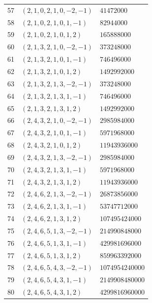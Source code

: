 \begin{longtable}{@{}rll@{}}
57 & $(2,1,0,2,1,0,-2,-1)$ & $41472000$\\
58 & $(2,1,0,2,1,0,1,-1)$ & $82944000$\\
59 & $(2,1,0,2,1,0,1,2)$ & $165888000$\\
60 & $(2,1,3,2,1,0,-2,-1)$ & $373248000$\\
61 & $(2,1,3,2,1,0,1,-1)$ & $746496000$\\
62 & $(2,1,3,2,1,0,1,2)$ & $1492992000$\\
63 & $(2,1,3,2,1,3,-2,-1)$ & $373248000$\\
64 & $(2,1,3,2,1,3,1,-1)$ & $746496000$\\
65 & $(2,1,3,2,1,3,1,2)$ & $1492992000$\\
66 & $(2,4,3,2,1,0,-2,-1)$ & $2985984000$\\
67 & $(2,4,3,2,1,0,1,-1)$ & $5971968000$\\
68 & $(2,4,3,2,1,0,1,2)$ & $11943936000$\\
69 & $(2,4,3,2,1,3,-2,-1)$ & $2985984000$\\
70 & $(2,4,3,2,1,3,1,-1)$ & $5971968000$\\
71 & $(2,4,3,2,1,3,1,2)$ & $11943936000$\\
72 & $(2,4,6,2,1,3,-2,-1)$ & $26873856000$\\
73 & $(2,4,6,2,1,3,1,-1)$ & $53747712000$\\
74 & $(2,4,6,2,1,3,1,2)$ & $107495424000$\\
75 & $(2,4,6,5,1,3,-2,-1)$ & $214990848000$\\
76 & $(2,4,6,5,1,3,1,-1)$ & $429981696000$\\
77 & $(2,4,6,5,1,3,1,2)$ & $859963392000$\\
78 & $(2,4,6,5,4,3,-2,-1)$ & $1074954240000$\\
79 & $(2,4,6,5,4,3,1,-1)$ & $2149908480000$\\
80 & $(2,4,6,5,4,3,1,2)$ & $4299816960000$\\
\end{longtable}
\endgroup

